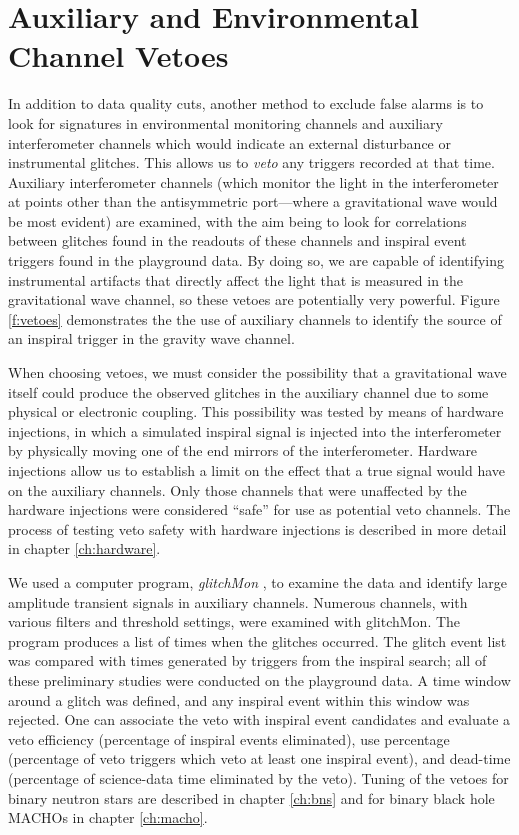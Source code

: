 \section{Auxiliary and Environmental Channel Vetoes}
\label{s:vetoes}

In addition to data quality cuts, another method to exclude false alarms is to
look for signatures in environmental monitoring channels and auxiliary
interferometer channels which would indicate an external disturbance or
instrumental glitches. This allows us to {\it veto} any triggers recorded at
that time.  Auxiliary interferometer channels (which monitor the light in the
interferometer at points other than the antisymmetric port---where a
gravitational wave would be most evident) are examined, with the aim being to
look for correlations between glitches found in the readouts of these channels
and inspiral event triggers found in the playground data.  By doing so, we are
capable of identifying instrumental artifacts that directly affect the light
that is measured in the gravitational wave channel, so these vetoes are
potentially very powerful. Figure \ref{f:vetoes} demonstrates the the use of
auxiliary channels to identify the source of an inspiral trigger in the
gravity wave channel.

When choosing vetoes, we must consider the possibility that a gravitational
wave itself could produce the observed glitches in the auxiliary channel due
to some physical or electronic coupling.  This possibility was tested by means
of hardware injections, in which a simulated inspiral signal is injected into
the interferometer by physically moving one of the end mirrors of the
interferometer. Hardware injections allow us to establish a limit on the
effect that a true signal would have on the auxiliary channels.  Only those
channels that were unaffected by the hardware injections were considered
``safe'' for use as potential veto channels. The process of testing veto
safety with hardware injections is described in more detail in chapter
\ref{ch:hardware}.

We used a computer program, {\it glitchMon} \cite{glitchMon}, to examine the
data and identify large amplitude transient signals in auxiliary channels.
Numerous channels, with various filters and threshold settings, were examined
with glitchMon. The program produces a list of times when the glitches
occurred. The glitch event list was compared with times generated by triggers
from the inspiral search; all of these preliminary studies were conducted on
the playground data.  A time window around a glitch was defined, and any
inspiral event within this window was rejected. One can associate the veto
with inspiral event candidates and evaluate a veto efficiency (percentage of
inspiral events eliminated), use percentage (percentage of veto triggers which
veto at least one inspiral event), and dead-time (percentage of science-data
time eliminated by the veto). Tuning of the vetoes for binary neutron stars
are described in chapter \ref{ch:bns} and for binary black hole MACHOs in
chapter \ref{ch:macho}.


